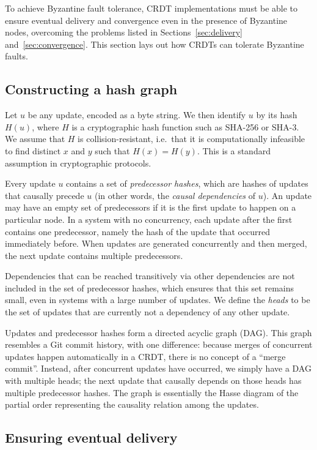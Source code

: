 \documentclass[sigplan,review]{acmart}
\begin{document}
To achieve Byzantine fault tolerance, CRDT implementations must be able to ensure eventual delivery and convergence even in the presence of Byzantine nodes, overcoming the problems listed in Sections~\ref{sec:delivery} and~\ref{sec:convergence}.
This section lays out how CRDTs can tolerate Byzantine faults.

\subsection{Constructing a hash graph}\label{sec:hash-graph}

Let $u$ be any update, encoded as a byte string.
We then identify $u$ by its hash $H(u)$, where $H$ is a cryptographic hash function such as SHA-256 or SHA-3.
We assume that $H$ is collision-resistant, i.e.\ that it is computationally infeasible to find distinct $x$ and $y$ such that $H(x) = H(y)$.
This is a standard assumption in cryptographic protocols.

Every update $u$ contains a set of \emph{predecessor hashes}, which are hashes of updates that causally precede $u$ (in other words, the \emph{causal dependencies} of $u$).
An update may have an empty set of predecessors if it is the first update to happen on a particular node.
In a system with no concurrency, each update after the first contains one predecessor, namely the hash of the update that occurred immediately before.
When updates are generated concurrently and then merged, the next update contains multiple predecessors.

Dependencies that can be reached transitively via other dependencies are not included in the set of predecessor hashes, which ensures that this set remains small, even in systems with a large number of updates.
We define the \emph{heads} to be the set of updates that are currently not a dependency of any other update.

Updates and predecessor hashes form a directed acyclic graph (DAG).
This graph resembles a Git commit history, with one difference: because merges of concurrent updates happen automatically in a CRDT, there is no concept of a ``merge commit''.
Instead, after concurrent updates have occurred, we simply have a DAG with multiple heads; the next update that causally depends on those heads has multiple predecessor hashes.
The graph is essentially the Hasse diagram of the partial order representing the causality relation among the updates.

\subsection{Ensuring eventual delivery}\label{sec:ensuring-delivery}
\end{document}
